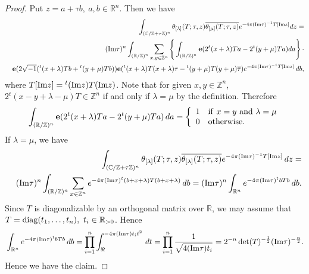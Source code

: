 \documentclass[11pt]{amsart}
\numberwithin{equation}{section}
\theoremstyle{definition}
\begin{document}
\begin{proof} Put $z=a+\tau b,\ a,b\in {\mathbb{R}}^n$. Then we have 
\begin{eqnarray*}
&&{\displaystyle}\int_{({\mathbb{C}}/{\mathbb{Z}}+\tau{\mathbb{Z}})^n}
 \theta_{[\lambda]}(T;\tau,z)\overline{\theta_{[\mu]}(T;\tau,z)}e^{-4\pi({\rm Im} \tau)^{-1}
T[{\rm Im}z]}dz=\\
&&({\rm Im}\tau)^n{\displaystyle}\int_{({\mathbb{R}}/{\mathbb{Z}})^n} \sum_{x,y\in{\mathbb{Z}}^n}\left\{{\displaystyle}\int_{({\mathbb{R}}/{\mathbb{Z}})^n}
\bold{e}(2{}^t(x+\lambda)Ta-2{}^t(y+\mu)Ta)da\right\}\cdot \\
&&\bold{e}(2\sqrt{-1}({}^t(x+\lambda)Tb+{}^t(y+\mu)Tb))\bold{e}({}^t(x+\lambda)T(x+\lambda)\tau-{}^t(y+\mu)T(y+\mu)\overline{\tau}) e^{-4\pi({\rm Im} \tau)^{-1}T[{\rm Im}z]}\,db,
\end{eqnarray*}
where $T[{\rm Im}z]={}^t({\rm Im}z)T({\rm Im}z)$. 
Note that for given $x,y\in{\mathbb{Z}}^n$, $2 {}^t(x-y+\lambda-\mu)T\in {\mathbb{Z}}^n$ if and only if $\lambda=\mu$ by the definition.  
Therefore
$${\displaystyle}\int_{({\mathbb{R}}/{\mathbb{Z}})^n}
\bold{e}(2{}^t(x+\lambda)Ta-2{}^t(y+\mu)Ta)\, da
=\left\{
\begin{array}{ll}
1 & {\rm if}\ x=y\ {\rm and}\ \lambda=\mu \\
0& {\rm otherwise}.
\end{array}\right.
$$ 
If $\lambda=\mu$, we have 
\begin{eqnarray*}
&&{\displaystyle}\int_{({\mathbb{C}}/{\mathbb{Z}}+\tau{\mathbb{Z}})^n}
 \theta_{[\lambda]}(T;\tau,z)\overline{\theta_{[\lambda]}(T;\tau,z)}e^{-4\pi({\rm Im} \tau)^{-1}
T[{\rm Im}z]}\, dz=\\
&&({\rm Im}\tau)^n{\displaystyle}\int_{({\mathbb{R}}/{\mathbb{Z}})^n} \sum_{x\in{\mathbb{Z}}^n}e^{-4\pi ({\rm Im}\tau){}^t(b+x+\lambda)T(b+x+\lambda)}\, db
=({\rm Im}\tau)^n{\displaystyle}\int_{{\mathbb{R}}^n} e^{-4\pi({\rm Im}\tau){}^tbTb}\, db.
\end{eqnarray*}
Since $T$ is diagonalizable by an orthogonal matrix over ${\mathbb{R}}$, we may assume that $T={{\rm diag}}(t_1,\ldots,t_n),\ t_i\in {\mathbb{R}}_{>0}$. 
Hence
$${\displaystyle}\int_{{\mathbb{R}}^n} e^{-4\pi({\rm Im}\tau){}^tbTb}\, db=\prod_{i=1}^n\int_\Re^{-4\pi({\rm Im}\tau) t_i t^2}\, dt=
\prod_{i=1}^n\frac{1}{\sqrt{4({\rm Im}\tau) t_i}}=2^{-n}\det(T)^{-\frac{1}{2}}({\rm Im}\tau)^{-\frac{n}{2}}.
$$
Hence we have the claim. 
\end{proof}
\end{document}
